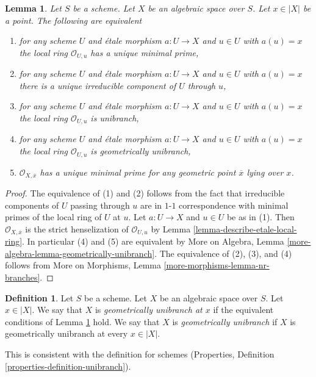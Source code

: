 \documentclass{stacks-project}
\theoremstyle{plain}
\newtheorem{lemma}[subsection]{Lemma}
\theoremstyle{definition}
\newtheorem{definition}[subsection]{Definition}
\theoremstyle{remark}
\numberwithin{equation}{subsection}
\begin{document}
\begin{lemma}
\label{lemma-irreducible-local-ring}
Let $S$ be a scheme.
Let $X$ be an algebraic space over $S$.
Let $x \in |X|$ be a point.
The following are equivalent
\begin{enumerate}
\item for any scheme $U$ and \'etale morphism $a : U \to X$ and
$u \in U$ with $a(u) = x$ the local ring $\mathcal{O}_{U, u}$ has a
unique minimal prime,
\item for any scheme $U$ and \'etale morphism $a : U \to X$ and
$u \in U$ with $a(u) = x$ there is a unique irreducible component of $U$
through $u$,
\item for any scheme $U$ and \'etale morphism $a : U \to X$ and
$u \in U$ with $a(u) = x$ the local ring $\mathcal{O}_{U, u}$
is unibranch,
\item for any scheme $U$ and \'etale morphism $a : U \to X$ and
$u \in U$ with $a(u) = x$ the local ring $\mathcal{O}_{U, u}$
is geometrically unibranch,
\item $\mathcal{O}_{X, \overline{x}}$ has a unique minimal prime
for any geometric point $\overline{x}$ lying over $x$.
\end{enumerate}
\end{lemma}

\begin{proof}
The equivalence of (1) and (2) follows from the fact that irreducible
components of $U$ passing through $u$ are in $1$-$1$ correspondence with
minimal primes of the local ring of $U$ at $u$. Let $a : U \to X$ and
$u \in U$ be as in (1). Then $\mathcal{O}_{X, \overline{x}}$ is
the strict henselization of $\mathcal{O}_{U, u}$ by
Lemma \ref{lemma-describe-etale-local-ring}.
In particular (4) and (5) are equivalent by
More on Algebra, Lemma \ref{more-algebra-lemma-geometrically-unibranch}.
The equivalence of (2), (3), and (4) follows from
More on Morphisms, Lemma \ref{more-morphisms-lemma-nr-branches}.
\end{proof}

\begin{definition}
\label{definition-unibranch}
Let $S$ be a scheme. Let $X$ be an algebraic space over $S$.
Let $x \in |X|$. We say that $X$ is {\it geometrically unibranch
at $x$} if the equivalent conditions of
Lemma \ref{lemma-irreducible-local-ring}
hold. We say that $X$ is {\it geometrically unibranch} if $X$ is
geometrically unibranch at every $x \in |X|$.
\end{definition}

\noindent
This is consistent with the definition for schemes
(Properties, Definition \ref{properties-definition-unibranch}).
\end{document}
